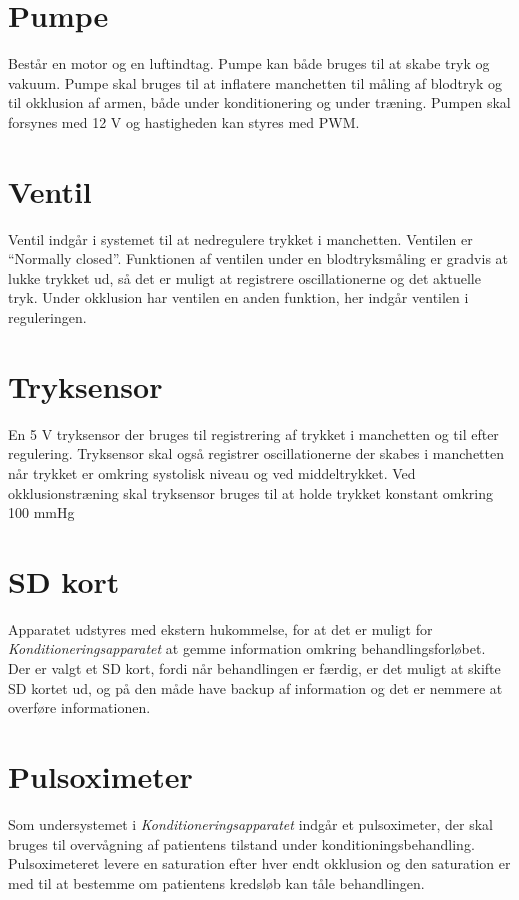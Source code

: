 \section{Pumpe}
Består en motor og en luftindtag. Pumpe kan både bruges til at skabe tryk og vakuum. Pumpe skal bruges til at inflatere manchetten til måling af blodtryk og til okklusion af armen, både under konditionering og under træning. Pumpen skal forsynes med 12 V og hastigheden kan styres med PWM. 

\section{Ventil}
Ventil indgår i systemet til at nedregulere trykket i manchetten. Ventilen er “Normally closed”. Funktionen af ventilen under en blodtryksmåling er gradvis at lukke trykket ud, så det er muligt at registrere oscillationerne og det aktuelle tryk. Under okklusion har ventilen en anden funktion, her indgår ventilen i reguleringen.

\section{Tryksensor}
En 5 V tryksensor der bruges til registrering af trykket i manchetten og til efter regulering. Tryksensor skal også registrer oscillationerne der skabes i manchetten når trykket er omkring systolisk niveau og ved middeltrykket. Ved okklusionstræning skal tryksensor bruges til at holde trykket konstant omkring 100 mmHg

\section{SD kort}
Apparatet udstyres med ekstern hukommelse, for at det er muligt for \textit{Konditioneringsapparatet} at gemme information omkring behandlingsforløbet. Der er valgt et SD kort, fordi når behandlingen er færdig, er det muligt at skifte SD kortet ud, og på den måde have backup af information og det er nemmere at overføre informationen. 

\section{Pulsoximeter}
Som undersystemet i \textit{Konditioneringsapparatet} indgår et pulsoximeter, der skal bruges til overvågning af patientens tilstand under konditioningsbehandling. Pulsoximeteret levere en saturation efter hver endt okklusion og den saturation er med til at bestemme om patientens kredsløb kan tåle behandlingen.